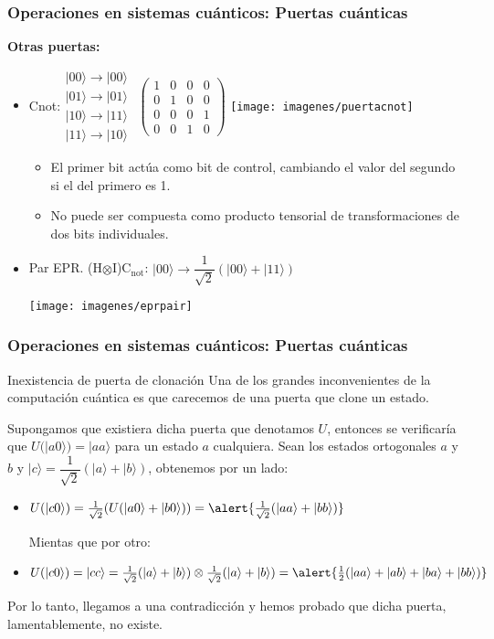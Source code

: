 \documentclass{beamer}
\newcommand{\filacuatro}[4]{ \left. \begin{array}{c}#1\\#2\\#3\\#4	\end{array} \right.}
\newcommand{\base}[1]{|#1\rangle}
\newcommand{\puertacnot}{\texttt{[image: imagenes/puertacnot]}}
\newcommand{\eprpair}{\texttt{[image: imagenes/eprpair]}}
\begin{document}
\begin{frame}
	\frametitle{Operaciones en sistemas cuánticos: Puertas cuánticas}
	\textbf{Otras puertas:}
	\begin{itemize}
	\item Cnot:$\filacuatro{\base{00}\to\base{00}}{\base{01}\to\base{01}}{\base{10}\to\base{11}}{\base{11}\to\base{10}}$
	$\left({\begin{array}{cccc}1&0&0&0\\0&1&0&0\\0&0&0&1\\0&0&1&0\end{array} } \right)$ \puertacnot
		\begin{itemize}
		\item El primer bit actúa como bit de control, cambiando el valor del segundo si el del primero es 1.
		\item No puede ser compuesta como producto tensorial de transformaciones de dos bits individuales.
		\end{itemize}
	\item Par EPR. (H$\otimes$I)C$_{\mathrm{not}}$: $\base{00}\to\dfrac{1}{\sqrt{2}}(\base{00}+\base{11})$ \begin{center}\eprpair\end{center}
	
	\end{itemize}
\end{frame}

\begin{frame}
	\frametitle{Operaciones en sistemas cuánticos: Puertas cuánticas}
	\begin{block}{Inexistencia de puerta de clonación}
	Una de los grandes inconvenientes de la computación cuántica es que carecemos de una puerta que clone un estado.
	\end{block}
	Supongamos que existiera dicha puerta que denotamos $U$, entonces se verificaría que $U(\base{a0})=\base{aa}$ para un estado $a$ cualquiera. Sean los estados ortogonales $a$ y $b$ y $\base c = \dfrac{1}{\sqrt{2}}(\base{a}+\base{b})$, obtenemos por un lado:
	\begin{itemize}
	\item $U(\base{c0})=\frac{1}{\sqrt{2}}(U(\base{a0}+\base{b0}))=\alert{\frac{1}{\sqrt{2}}(\base{aa}+\base{bb})}$
	
	Mientas que por otro:
	\item $U(\base{c0})=\base{cc}=\frac{1}{\sqrt{2}}(\base a + \base b)\otimes\frac{1}{\sqrt{2}}(\base a + \base b)=\alert{\frac{1}{2}(\base{aa}+\base{ab}+\base{ba}+\base{bb})}$
	\end{itemize}		
	Por lo tanto, llegamos a una contradicción y hemos probado que dicha puerta, lamentablemente, no existe.
	
	
\end{frame}
\end{document}

